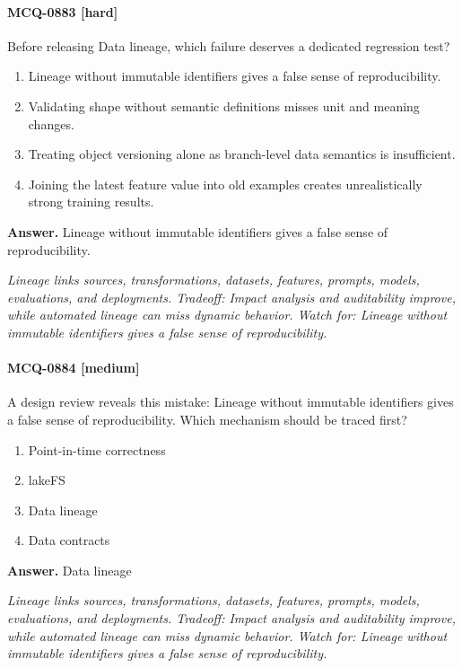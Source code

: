 \paragraph{MCQ-0883 [hard]} Before releasing Data lineage, which failure deserves a dedicated regression test?
\begin{enumerate}[label=\Alph*.]
\item Lineage without immutable identifiers gives a false sense of reproducibility.
\item Validating shape without semantic definitions misses unit and meaning changes.
\item Treating object versioning alone as branch-level data semantics is insufficient.
\item Joining the latest feature value into old examples creates unrealistically strong training results.
\end{enumerate}
\noindent\textbf{Answer.} Lineage without immutable identifiers gives a false sense of reproducibility.
\par\textit{Lineage links sources, transformations, datasets, features, prompts, models, evaluations, and deployments. Tradeoff: Impact analysis and auditability improve, while automated lineage can miss dynamic behavior. Watch for: Lineage without immutable identifiers gives a false sense of reproducibility.}
\paragraph{MCQ-0884 [medium]} A design review reveals this mistake: Lineage without immutable identifiers gives a false sense of reproducibility. Which mechanism should be traced first?
\begin{enumerate}[label=\Alph*.]
\item Point-in-time correctness
\item lakeFS
\item Data lineage
\item Data contracts
\end{enumerate}
\noindent\textbf{Answer.} Data lineage
\par\textit{Lineage links sources, transformations, datasets, features, prompts, models, evaluations, and deployments. Tradeoff: Impact analysis and auditability improve, while automated lineage can miss dynamic behavior. Watch for: Lineage without immutable identifiers gives a false sense of reproducibility.}
